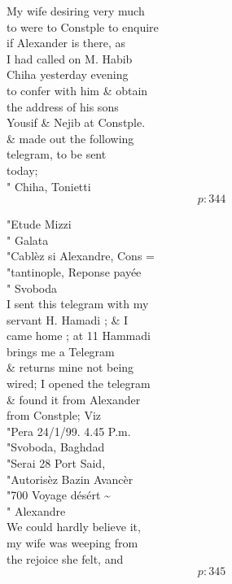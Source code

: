 \documentclass{report}
\begin{document}
	\par{
 	My wife desiring very much\ \\to were to Constple to enquire\ \\if Alexander is there, as\ \\I had called on M. Habib\ \\Chiha yesterday evening\ \\to confer with him \& obtain\ \\the address of his sons\ \\Yousif \& Nejib at Constple.\ \\\& made out the following\ \\telegram, to be sent\ \\today;\ \\" Chiha, Tonietti\ \\
  \[p: 344 \]

	}

	\par{
 	"Etude Mizzi\ \\" Galata\ \\"Cablèz si Alexandre, Cons =\ \\"tantinople, Reponse payée\ \\" Svoboda\ \\I sent this telegram with my\ \\servant H. Hamadi ; \& I\ \\came home ; at 11 Hammadi\ \\brings me a Telegram\ \\\& returns mine not being\ \\wired; I opened the telegram\ \\\& found it from Alexander\ \\from Constple; Viz\ \\"Pera 24/1/99. 4.45 P.m.\ \\"Svoboda, Baghdad\ \\"Serai 28 Port Said,\ \\"Autorisèz Bazin Avancèr\ \\"700 Voyage désért \~{}\ \\" Alexandre\ \\We could hardly believe it,\ \\my wife was weeping from\ \\the rejoice she felt, and\ \\
  \[p: 345 \]

	}

\end{document}
